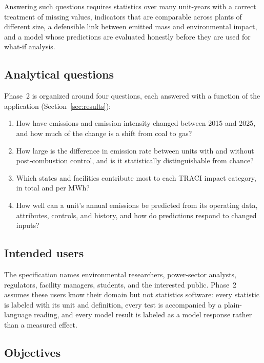 \documentclass[11pt,a4paper]{article}
\begin{document}
Answering such questions requires statistics over many unit-years with a correct treatment of
missing values, indicators that are comparable across plants of different size, a defensible
link between emitted mass and environmental impact, and a model whose predictions are evaluated
honestly before they are used for what-if analysis.

\subsection{Analytical questions}

Phase~2 is organized around four questions, each answered with a function of the application
(Section~\ref{sec:results}):
\begin{enumerate}[label=Q\arabic*.]
  \item How have emissions and emission intensity changed between 2015 and 2025, and how much of
        the change is a shift from coal to gas?
  \item How large is the difference in \NOx{} emission rate between units with and without
        post-combustion \NOx{} control, and is it statistically distinguishable from chance?
  \item Which states and facilities contribute most to each TRACI impact category, in total and
        per MWh?
  \item How well can a unit's annual \NOx{} emissions be predicted from its operating data,
        attributes, controls, and history, and how do predictions respond to changed inputs?
\end{enumerate}

\subsection{Intended users}

The specification names environmental researchers, power-sector analysts, regulators, facility
managers, students, and the interested public. Phase~2 assumes these users know their domain
but not statistics software: every statistic is labeled with its unit and definition, every
test is accompanied by a plain-language reading, and every model result is labeled as a model
response rather than a measured effect.

\subsection{Objectives}
\end{document}
